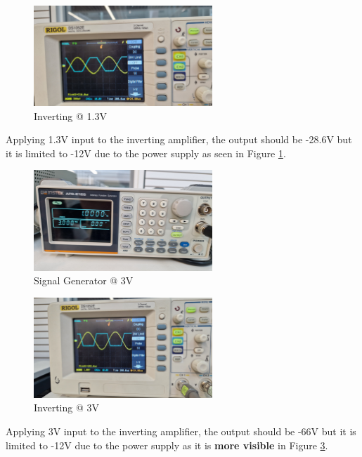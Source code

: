 \begin{figure}[h]
    \centering
    \includegraphics[width=0.6\textwidth]{assets/inverting-1.3-output.jpg}
    \caption{Inverting @ 1.3V}
    \label{fig:inverting-1.3-output}
\end{figure}

Applying 1.3V input to the inverting amplifier, the output should be -28.6V but it is limited to -12V due to the power supply as seen in Figure \ref{fig:inverting-1.3-output}.

\newpage
\thispagestyle{plain}

\begin{figure}[h]
    \centering
    \includegraphics[width=0.6\textwidth]{assets/inverting-3.jpg}
    \caption{Signal Generator @ 3V}
    \label{fig:inverting-3}
\end{figure}

\begin{figure}[h]
    \centering
    \includegraphics[width=0.6\textwidth]{assets/inverting-3-output.jpg}
    \caption{Inverting @ 3V}
    \label{fig:inverting-3-output}
\end{figure}

Applying 3V input to the inverting amplifier, the output should be -66V but it is limited to -12V due to the power supply as it is \textbf{more visible} in Figure \ref{fig:inverting-3-output}.
